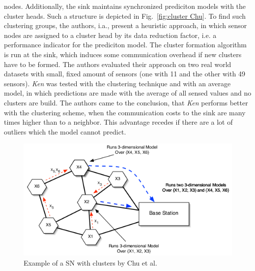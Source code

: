nodes. Additionally, the sink maintains synchronized prediciton models
with the cluster heads. Such a structure is depicted in Fig.~\ref{fig:cluster
Chu}. To find such clustering groups, the authors, i.a., present a heuristic
approach, in which sensor nodes are assigned to a cluster head by its data
reduction factor, i.e. a performance indicator for the prediciton model. The
cluster formation algorithm is run at the sink, which induces some
communication overhead if new clusters have to be formed. The authors evaluated
their approach on two real world datasets with small, fixed amount of sensors
(one with 11 and the other with 49 sensors). \textit{Ken} was tested with the
clustering technique and with an average model, in which predictions are made
with the average of all sensed values and no clusters are build. The authors
came to the conclusion, that \textit{Ken} performs better with the clustering
scheme, when the communication costs to the sink are many times higher
than to a neighbor. This advantage recedes if there are a lot of outliers which
the model cannot predict.

\begin{figure}[h]
\includegraphics[width=\linewidth]{images/ken-clustering.png}
\caption{Example of a \ac{SN} with clusters by Chu et al.~\cite{chu2006approximate}}
\label{fig:cluster Chu}
\centering
\end{figure}

